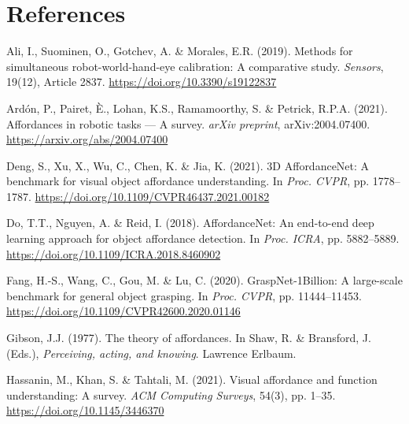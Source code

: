 \documentclass[11pt,a4paper]{article}
\begin{document}
\newpage
\section*{References}

\begin{enumerate}[label={[\arabic*]}, leftmargin=1.2cm, itemsep=3pt]

\item Ali, I., Suominen, O., Gotchev, A. \& Morales, E.R. (2019). Methods for simultaneous robot-world-hand-eye calibration: A comparative study. \textit{Sensors}, 19(12), Article 2837. \href{https://doi.org/10.3390/s19122837}{https://doi.org/10.3390/s19122837}

\item Ard\'{o}n, P., Pairet, \`{E}., Lohan, K.S., Ramamoorthy, S. \& Petrick, R.P.A. (2021). Affordances in robotic tasks --- A survey. \textit{arXiv preprint}, arXiv:2004.07400. \href{https://arxiv.org/abs/2004.07400}{https://arxiv.org/abs/2004.07400}

\item Deng, S., Xu, X., Wu, C., Chen, K. \& Jia, K. (2021). 3D AffordanceNet: A benchmark for visual object affordance understanding. In \textit{Proc. CVPR}, pp. 1778--1787. \href{https://doi.org/10.1109/CVPR46437.2021.00182}{https://doi.org/10.1109/CVPR46437.2021.00182}

\item Do, T.T., Nguyen, A. \& Reid, I. (2018). AffordanceNet: An end-to-end deep learning approach for object affordance detection. In \textit{Proc. ICRA}, pp. 5882--5889. \href{https://doi.org/10.1109/ICRA.2018.8460902}{https://doi.org/10.1109/ICRA.2018.8460902}

\item Fang, H.-S., Wang, C., Gou, M. \& Lu, C. (2020). GraspNet-1Billion: A large-scale benchmark for general object grasping. In \textit{Proc. CVPR}, pp. 11444--11453. \href{https://doi.org/10.1109/CVPR42600.2020.01146}{https://doi.org/10.1109/CVPR42600.2020.01146}

\item Gibson, J.J. (1977). The theory of affordances. In Shaw, R. \& Bransford, J. (Eds.), \textit{Perceiving, acting, and knowing}. Lawrence Erlbaum.

\item Hassanin, M., Khan, S. \& Tahtali, M. (2021). Visual affordance and function understanding: A survey. \textit{ACM Computing Surveys}, 54(3), pp. 1--35. \href{https://doi.org/10.1145/3446370}{https://doi.org/10.1145/3446370}


\end{enumerate}
\end{document}
